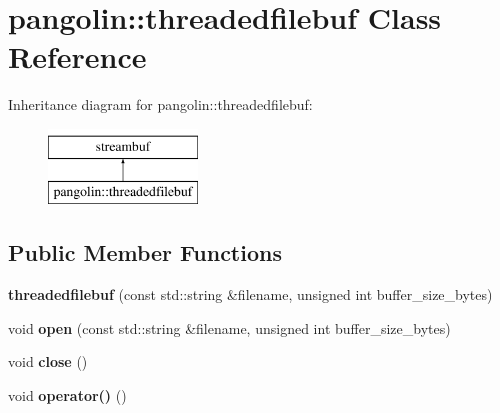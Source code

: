 \hypertarget{classpangolin_1_1threadedfilebuf}{}\section{pangolin\+:\+:threadedfilebuf Class Reference}
\label{classpangolin_1_1threadedfilebuf}
Inheritance diagram for pangolin\+:\+:threadedfilebuf\+:\begin{figure}[H]
\begin{center}
\leavevmode
\includegraphics[height=2.000000cm]{classpangolin_1_1threadedfilebuf}
\end{center}
\end{figure}
\subsection*{Public Member Functions}
\begin{DoxyCompactItemize}
\item 
{\bfseries threadedfilebuf} (const std\+::string \&filename, unsigned int buffer\+\_\+size\+\_\+bytes)\hypertarget{classpangolin_1_1threadedfilebuf_a1f8f48af4418b08e5858476db6a0bf7d}{}\label{classpangolin_1_1threadedfilebuf_a1f8f48af4418b08e5858476db6a0bf7d}

\item 
void {\bfseries open} (const std\+::string \&filename, unsigned int buffer\+\_\+size\+\_\+bytes)\hypertarget{classpangolin_1_1threadedfilebuf_ac2bbd1798e737480bbbcddb70e8bf286}{}\label{classpangolin_1_1threadedfilebuf_ac2bbd1798e737480bbbcddb70e8bf286}

\item 
void {\bfseries close} ()\hypertarget{classpangolin_1_1threadedfilebuf_a26caf0a8836f0a095f0c34b1f8e16eb5}{}\label{classpangolin_1_1threadedfilebuf_a26caf0a8836f0a095f0c34b1f8e16eb5}

\item 
void {\bfseries operator()} ()\hypertarget{classpangolin_1_1threadedfilebuf_a0eda1c760b1fbca3866af2b9db630c61}{}\label{classpangolin_1_1threadedfilebuf_a0eda1c760b1fbca3866af2b9db630c61}

\end{DoxyCompactItemize}
